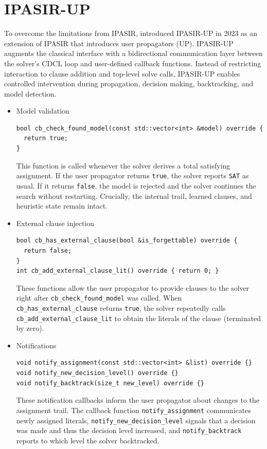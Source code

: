 \documentclass[12pt,a4paper]{article}
\begin{document}
\newpage

\section{IPASIR-UP}
\label{sec:ipasir_up}
To overcome the limitations from IPASIR, \citet{fazekas_et_al:LIPIcs.SAT.2023.8} introduced IPASIR-UP in 2023 as an extension of IPASIR that introduces user propagators (UP). IPASIR-UP augments the classical interface with a bidirectional communication layer between the solver's CDCL loop and user-defined callback functions. Instead of restricting interaction to clause addition and top-level solve calls, IPASIR-UP enables controlled intervention during propagation, decision making, backtracking, and model detection.

\begin{itemize}
\item Model validation
\begin{verbatim}
bool cb_check_found_model(const std::vector<int> &model) override {
  return true;
}
\end{verbatim}
  This function is called whenever the solver derives a total satisfying assignment. If the user propagator returns \verb|true|, the solver reports \verb|SAT| as usual. If it returns \verb|false|, the model is rejected and the solver continues the search without restarting. Crucially, the internal trail, learned clauses, and heuristic state remain intact.

\item External clause injection
\begin{verbatim}
bool cb_has_external_clause(bool &is_forgettable) override {
  return false;
}
int cb_add_external_clause_lit() override { return 0; }
\end{verbatim}
  These functions allow the user propagator to provide clauses to the solver right after \verb|cb_check_found_model| was called. When \verb|cb_has_external_clause| returns \verb|true|, the solver repeatedly calls \verb|cb_add_external_clause_lit| to obtain the literals of the clause (terminated by zero).

\item Notifications
\begin{verbatim}
void notify_assignment(const std::vector<int> &list) override {}
void notify_new_decision_level() override {}
void notify_backtrack(size_t new_level) override {}
\end{verbatim}
  These notification callbacks inform the user propagator about changes to the assignment trail. The callback function \verb|notify_assignment| communicates newly assigned literals, \verb|notify_new_decision_level| signals that a decision was made and thus the decision level increased, and \verb|notify_backtrack| reports to which level the solver backtracked.


\end{itemize}
\end{document}
